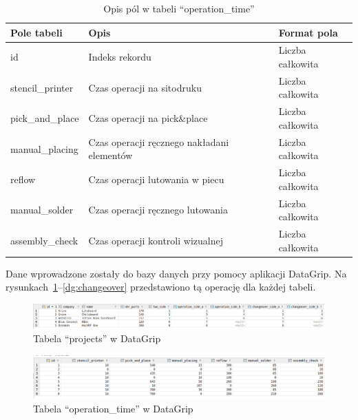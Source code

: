 \begin{table}[H]
	\centering
	\caption{Opis pól w tabeli ``operation\_time''}
	\begin{tabular}{lll}
		\toprule
		Pole tabeli      & Opis                                          & Format pola       \\
		\midrule
		id               & Indeks rekordu                                & Liczba całkowita \\
		stencil\_printer & Czas operacji na sitodruku                    & Liczba całkowita \\
		pick\_and\_place & Czas operacji na pick\&place                  & Liczba całkowita \\
		manual\_placing  & Czas operacji ręcznego nakładani elementów & Liczba całkowita \\
		reflow           & Czas operacji lutowania w piecu               & Liczba całkowita \\
		manual\_solder   & Czas operacji ręcznego lutowania             & Liczba całkowita \\
		assembly\_check  & Czas operacji kontroli wizualnej              & Liczba całkowita \\
		\bottomrule
	\end{tabular}
	\label{oper}
\end{table}

Dane wprowadzone zostały do bazy danych przy pomocy aplikacji DataGrip. Na rysunkach~\ref{dg:proj}--\ref{dg:changeover} przedstawiono tą operację dla każdej tabeli.

\begin{figure}[H]
	\centering
	\includegraphics[width=\linewidth]{chapters/chapter4/projects_db.png}
	\caption{Tabela ``projects'' w DataGrip}
	\label{dg:proj}
\end{figure}

\begin{figure}[H]
	\centering
	\includegraphics[width=\linewidth]{chapters/chapter4/opera_db.png}
	\caption{Tabela ``operation\_time'' w DataGrip}
	\label{dg:oper}
\end{figure}

